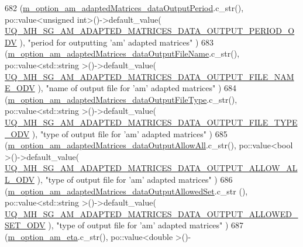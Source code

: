 \begin{DoxyCode}
682     (\hyperlink{class_q_u_e_s_o_1_1_metropolis_hastings_s_g_options_ac9a445e5def0140cc6cda1288bce2766}{m\_option\_am\_adaptedMatrices\_dataOutputPeriod}.c\_str(),     
         po::value<unsigned int>()->default\_value(
      \hyperlink{_metropolis_hastings_s_g_options_8h_a31b066c43b9db7ca162b06a0d57d9c0b}{UQ\_MH\_SG\_AM\_ADAPTED\_MATRICES\_DATA\_OUTPUT\_PERIOD\_ODV}     
           ), \textcolor{stringliteral}{"period for outputting 'am' adapted matrices"}                 )
683     (\hyperlink{class_q_u_e_s_o_1_1_metropolis_hastings_s_g_options_a50b5f394825d9c8848d11bd7636e2b5c}{m\_option\_am\_adaptedMatrices\_dataOutputFileName}.c\_str(), 
           po::value<std::string >()->default\_value(
      \hyperlink{_metropolis_hastings_s_g_options_8h_ac2b0e9a33eb3be7bd6fd8111d8b986b5}{UQ\_MH\_SG\_AM\_ADAPTED\_MATRICES\_DATA\_OUTPUT\_FILE\_NAME\_ODV}
             ), \textcolor{stringliteral}{"name of output file for 'am' adapted matrices"}              )
684     (\hyperlink{class_q_u_e_s_o_1_1_metropolis_hastings_s_g_options_a0f0a406b0e8cce9d82a4534dfb45c23b}{m\_option\_am\_adaptedMatrices\_dataOutputFileType}.c\_str(), 
           po::value<std::string >()->default\_value(
      \hyperlink{_metropolis_hastings_s_g_options_8h_a60696c3d037fd5cb02bdc3f9e12f2106}{UQ\_MH\_SG\_AM\_ADAPTED\_MATRICES\_DATA\_OUTPUT\_FILE\_TYPE\_ODV}
             ), \textcolor{stringliteral}{"type of output file for 'am' adapted matrices"}              )
685     (\hyperlink{class_q_u_e_s_o_1_1_metropolis_hastings_s_g_options_ac45686ae902b17824aa18e6414fc9039}{m\_option\_am\_adaptedMatrices\_dataOutputAllowAll}.c\_str(), 
           po::value<bool        >()->default\_value(
      \hyperlink{_metropolis_hastings_s_g_options_8h_ad90cbc865c4aa502656a2fd432519fec}{UQ\_MH\_SG\_AM\_ADAPTED\_MATRICES\_DATA\_OUTPUT\_ALLOW\_ALL\_ODV}
             ), \textcolor{stringliteral}{"type of output file for 'am' adapted matrices"}              )
686     (\hyperlink{class_q_u_e_s_o_1_1_metropolis_hastings_s_g_options_a850b7d178f40d3afbfc2e82cbbcaf25f}{m\_option\_am\_adaptedMatrices\_dataOutputAllowedSet}.c\_str
      (),    po::value<std::string >()->default\_value(
      \hyperlink{_metropolis_hastings_s_g_options_8h_a98c334e708991b83cb8b1e24296c60c5}{UQ\_MH\_SG\_AM\_ADAPTED\_MATRICES\_DATA\_OUTPUT\_ALLOWED\_SET\_ODV}
           ), \textcolor{stringliteral}{"type of output file for 'am' adapted matrices"}              )
687     (\hyperlink{class_q_u_e_s_o_1_1_metropolis_hastings_s_g_options_af33c4f035c1e61c9c2109621ee2c61df}{m\_option\_am\_eta}.c\_str(),                                     po::value<double      >()-

\end{DoxyCode}

